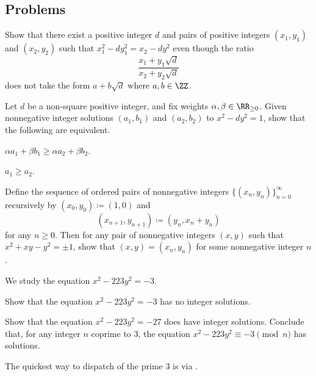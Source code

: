 \documentclass[../notes.tex]{subfiles}
\begin{document}


\subsection{Problems}
\begin{prob}[2 points] \label{prob:norm-equal-not-unit-ratio}
	Show that there exist a positive integer $d$ and pairs of positive integers $(x_1,y_1)$ and $(x_2,y_2)$ such that $x_1^2-dy_1^2=x_2-dy^2$ even though the ratio
	\[\frac{x_1+y_1\sqrt d}{x_2+y_2\sqrt d}\]
	does not take the form $a+b\sqrt d$ where $a,b\in\ZZ$.
\end{prob}
\begin{prob}[2 points] \label{prob:fund-unit-is-really-smallest}
	Let $d$ be a non-square positive integer, and fix weights $\alpha,\beta\in\RR_{\ge0}$. Given nonnegative integer solutions $(a_1,b_1)$ and $(a_2,b_2)$ to $x^2-dy^2=1$, show that the following are equivalent.
	\begin{listalph}
		\item $\alpha a_1+\beta b_1\ge\alpha a_2+\beta b_2$.
		\item $a_1\ge a_2$.
	\end{listalph}
\end{prob}
\begin{prob}[4 points] \label{prob:pell-5-norm}
	Define the sequence of ordered pairs of nonnegative integers $\{(x_n,y_n)\}_{n=0}^\infty$ recursively by $(x_0,y_0)\coloneqq(1,0)$ and
	\[(x_{n+1},y_{n+1})\coloneqq(y_n,x_n+y_n)\]
	for any $n\ge0$. Then for any pair of nonnegative integers $(x,y)$ such that $x^2+xy-y^2=\pm1$, show that $(x,y)=(x_n,y_n)$ for some nonnegative integer $n$.
\end{prob}
\begin{prob}[4 points] \label{prob:norm-223}
	We study the equation $x^2-223y^2=-3$.
	\begin{listalph}
		\item Show that the equation $x^2-223y^2=-3$ has no integer solutions.
		\item Show that the equation $x^2-223y^2=-27$ does have integer solutions. Conclude that, for any integer $n$ coprime to $3$, the equation $x^2-223y^2\equiv-3\pmod n$  has solutions.
	\end{listalph}
	The quickest way to dispatch of the prime $3$ is via .
\end{prob}
\end{document}
